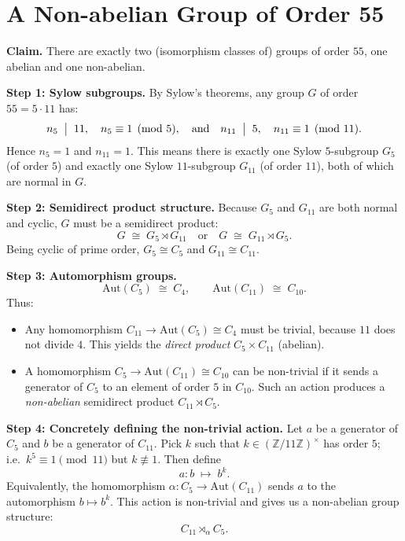 \documentclass[12pt]{article}
\title{}
\author{Jerich Lee}
\date{\today}
\theoremstyle{definition} %
\theoremstyle{plain} %
\begin{document}
\maketitle
\section*{A Non-abelian Group of Order 55}

\textbf{Claim.} There are exactly two (isomorphism classes of) groups of order $55$, one abelian and one non-abelian.

\medskip

\noindent
\textbf{Step 1: Sylow subgroups.} 
By Sylow's theorems, any group $G$ of order $55 = 5 \cdot 11$ has:
\[
n_5 \;\bigm|\; 11,\quad n_5 \equiv 1 \pmod{5},
\quad\text{and}\quad
n_{11} \;\bigm|\; 5,\quad n_{11} \equiv 1 \pmod{11}.
\]
Hence $n_5 = 1$ and $n_{11} = 1$. This means there is exactly one Sylow $5$-subgroup $G_5$ (of order $5$) and exactly one Sylow $11$-subgroup $G_{11}$ (of order $11$), both of which are normal in $G$.

\medskip

\noindent
\textbf{Step 2: Semidirect product structure.} 
Because $G_5$ and $G_{11}$ are both normal and cyclic, $G$ must be a semidirect product:
\[
G \;\cong\; G_5 \rtimes G_{11}
\quad\text{or}\quad
G \;\cong\; G_{11} \rtimes G_5.
\]
Being cyclic of prime order, $G_5 \cong C_5$ and $G_{11} \cong C_{11}$.

\medskip

\noindent
\textbf{Step 3: Automorphism groups.}
\[
\mathrm{Aut}(C_{5}) \;\cong\; C_{4}, 
\quad\quad
\mathrm{Aut}(C_{11}) \;\cong\; C_{10}.
\]
Thus:
\begin{itemize}
\item Any homomorphism $C_{11} \to \mathrm{Aut}(C_{5}) \cong C_{4}$ must be trivial, because $11$ does not divide $4$. This yields the \emph{direct product} $C_5 \times C_{11}$ (abelian).
\item A homomorphism $C_5 \to \mathrm{Aut}(C_{11}) \cong C_{10}$ can be non-trivial if it sends a generator of $C_5$ to an element of order $5$ in $C_{10}$. Such an action produces a \emph{non-abelian} semidirect product $C_{11} \rtimes C_5$.
\end{itemize}

\medskip

\noindent
\textbf{Step 4: Concretely defining the non-trivial action.} 
Let $a$ be a generator of $C_5$ and $b$ be a generator of $C_{11}$. Pick $k$ such that $k \in (\mathbb{Z}/11\mathbb{Z})^\times$ has order $5$; i.e.\ $k^5 \equiv 1 \pmod{11}$ but $k \not\equiv 1$. Then define
\[
a : b \;\mapsto\; b^k.
\]
Equivalently, the homomorphism $\alpha: C_5 \to \mathrm{Aut}(C_{11})$ sends $a$ to the automorphism $b \mapsto b^k$. This action is non-trivial and gives us a non-abelian group structure:
\[
C_{11} \rtimes_{\alpha} C_{5}.
\]
\end{document}
